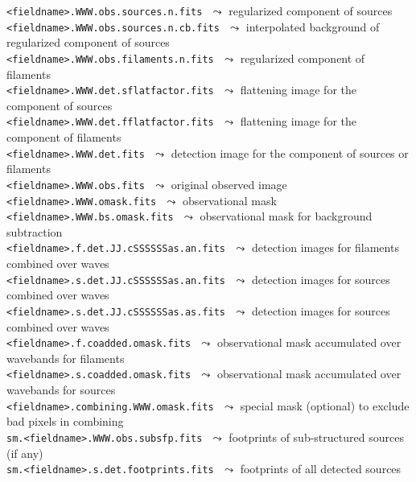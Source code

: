 \documentclass[a4paper,10pt]{article}
\begin{document}
\vspace{-2mm}\noindent
{\small\verb!<fieldname>.WWW.obs.sources.n.fits!} $\,\,\leadsto$ regularized component of sources\\
{\small\verb!<fieldname>.WWW.obs.sources.n.cb.fits!} $\,\,\leadsto$ interpolated background of regularized component of sources\\
{\small\verb!<fieldname>.WWW.obs.filaments.n.fits!} $\,\,\leadsto$ regularized component of filaments\\
{\small\verb!<fieldname>.WWW.det.sflatfactor.fits!} $\,\,\leadsto$ flattening image for the component of sources\\
{\small\verb!<fieldname>.WWW.det.fflatfactor.fits!} $\,\,\leadsto$ flattening image for the component of filaments\\
{\small\verb!<fieldname>.WWW.det.fits!} $\,\,\leadsto$ detection image for the component of sources or filaments\\
{\small\verb!<fieldname>.WWW.obs.fits!} $\,\,\leadsto$ original observed image\\
{\small\verb!<fieldname>.WWW.omask.fits!} $\,\,\leadsto$ observational mask\\
{\small\verb!<fieldname>.WWW.bs.omask.fits!} $\,\,\leadsto$ observational mask for background subtraction\\
{\small\verb!<fieldname>.f.det.JJ.cSSSSSSas.an.fits!} $\,\,\leadsto$ detection images for filaments combined over waves\\
{\small\verb!<fieldname>.s.det.JJ.cSSSSSSas.an.fits!} $\,\,\leadsto$ detection images for sources combined over waves\\
{\small\verb!<fieldname>.s.det.JJ.cSSSSSSas.as.fits!} $\,\,\leadsto$ detection images for sources combined over waves\\
{\small\verb!<fieldname>.f.coadded.omask.fits!} $\,\,\leadsto$ observational mask accumulated over wavebands for filaments\\
{\small\verb!<fieldname>.s.coadded.omask.fits!} $\,\,\leadsto$ observational mask accumulated over wavebands for sources\\
{\small\verb!<fieldname>.combining.WWW.omask.fits!} $\,\,\leadsto$ special mask (optional) to exclude bad pixels in combining\\
{\small\verb!sm.<fieldname>.WWW.obs.subsfp.fits!} $\,\,\leadsto$ footprints of sub-structured sources (if any)\\
{\small\verb!sm.<fieldname>.s.det.footprints.fits!} $\,\,\leadsto$ footprints of all detected sources\\
\end{document}
